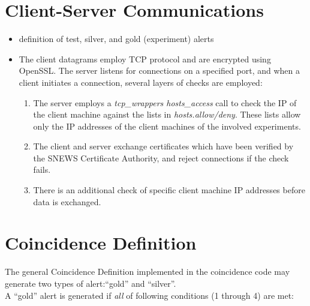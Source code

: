 \documentclass{article}
\begin{document}
\section{Client-Server Communications}
\begin{itemize}
\item definition of test, silver, and gold (experiment) alerts
\item The client datagrams employ TCP protocol and 
are encrypted using OpenSSL.  
The server listens for connections on a specified port,
and when a client initiates a connection, several layers
of checks are employed:
\begin{enumerate}
\item The server employs a {\it tcp\_wrappers hosts\_access}
call to check the IP of the client machine against the lists in
{\it hosts.allow/deny}.  These lists allow only the IP addresses
of the client machines of the involved experiments.
\item
The client and server exchange certificates which have been
verified by the SNEWS Certificate Authority, and reject
connections if the check fails.
\item There is an additional check of specific client machine
IP addresses before data is exchanged.
\end{enumerate}
\end{itemize}

\section{Coincidence Definition}

The general Coincidence Definition implemented in the coincidence code
may generate two types of alert:``gold'' and ``silver''.\\
A ``gold'' alert is generated if {\it all} of
following conditions (1 through 4) are met:
\end{document}
